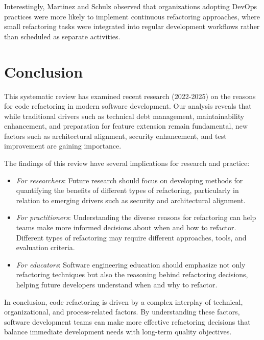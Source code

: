 \documentclass[journal,onecolumn]{IEEEtran}
\begin{document}
Interestingly, Martinez and Schulz \cite{martinez2023} observed that organizations adopting DevOps practices were more likely to implement continuous refactoring approaches, where small refactoring tasks were integrated into regular development workflows rather than scheduled as separate activities.

\section{Conclusion}
This systematic review has examined recent research (2022-2025) on the reasons for code refactoring in modern software development. Our analysis reveals that while traditional drivers such as technical debt management, maintainability enhancement, and preparation for feature extension remain fundamental, new factors such as architectural alignment, security enhancement, and test improvement are gaining importance.

The findings of this review have several implications for research and practice:

\begin{itemize}
    \item \textit{For researchers}: Future research should focus on developing methods for quantifying the benefits of different types of refactoring, particularly in relation to emerging drivers such as security and architectural alignment.
    
    \item \textit{For practitioners}: Understanding the diverse reasons for refactoring can help teams make more informed decisions about when and how to refactor. Different types of refactoring may require different approaches, tools, and evaluation criteria.
    
    \item \textit{For educators}: Software engineering education should emphasize not only refactoring techniques but also the reasoning behind refactoring decisions, helping future developers understand when and why to refactor.
\end{itemize}

In conclusion, code refactoring is driven by a complex interplay of technical, organizational, and process-related factors. By understanding these factors, software development teams can make more effective refactoring decisions that balance immediate development needs with long-term quality objectives.
\end{document}
